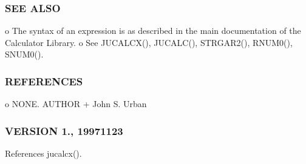 \subsubsection*{S\+EE A\+L\+SO}

\begin{DoxyVerb}   o The syntax of an expression is as described in the main documentation of the Calculator Library.
   o See JUCALCX(), JUCALC(), STRGAR2(), RNUM0(), SNUM0().
\end{DoxyVerb}


\subsubsection*{R\+E\+F\+E\+R\+E\+N\+C\+ES}

o N\+O\+NE. A\+U\+T\+H\+OR + John S. Urban \subsubsection*{V\+E\+R\+S\+I\+ON 1., 19971123}

References jucalcx().


